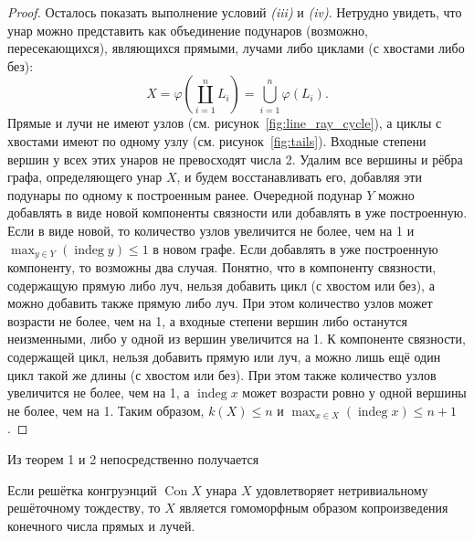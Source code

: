 \documentclass[11pt,twoside,final
]{article}
\def\Con{\operatorname{Con}}
\def\indeg{\operatorname{indeg}}
\begin{document}
\begin{proof}
	Осталось показать выполнение условий \textit{(iii)} и \textit{(iv)}.
	Нетрудно увидеть, что унар можно представить как объединение подунаров (возможно, пересекающихся), являющихся прямыми, лучами либо циклами (с хвостами либо без):
	\[
		X = \varphi(\coprod_{i = 1}^n L_i) = \bigcup_{i = 1}^n \varphi(L_i).
	\]
	Прямые и лучи не имеют узлов (см. рисунок~\ref{fig:line_ray_cycle}), а циклы с хвостами имеют по одному узлу (см. рисунок~\ref{fig:tails}).
	Входные степени вершин у всех этих унаров не превосходят числа 2.
	Удалим все вершины и рёбра графа, определяющего унар $X$, и будем восстанавливать его, добавляя эти подунары по одному к построенным ранее.
	Очередной подунар $Y$ можно добавлять в виде новой компоненты связности или добавлять в уже построенную.
	Если в виде новой, то количество узлов увеличится не более, чем на 1 и $\max_{y \in Y} (\indeg y) \leqslant 1$ в новом графе.
	Если добавлять в уже построенную компоненту, то возможны два случая.
	Понятно, что в компоненту связности, содержащую прямую либо луч, нельзя добавить цикл (с хвостом или без), а можно добавить также прямую либо луч.
	При этом количество узлов может возрасти не более, чем на 1, а входные степени вершин либо останутся неизменными, либо у одной из вершин увеличится на 1.
	К компоненте связности, содержащей цикл, нельзя добавить прямую или луч, а можно лишь ещё один цикл такой же длины (с хвостом или без).
	При этом также количество узлов увеличится не более, чем на 1, а $\indeg x$ может возрасти ровно у одной вершины не более, чем на 1.
	Таким образом, $k(X) \leqslant n$ и $\max_{x \in X} (\indeg x) \leqslant  n + 1$.
\end{proof}

Из теорем 1 и 2 непосредственно получается
\begin{corollary}
	Если решётка конгруэнций $\Con X$ унара $X$ удовлетворяет нетривиальному решёточному тождеству, то $X$ является гомоморфным образом копроизведения конечного числа прямых и лучей.
\end{corollary}
\end{document}
